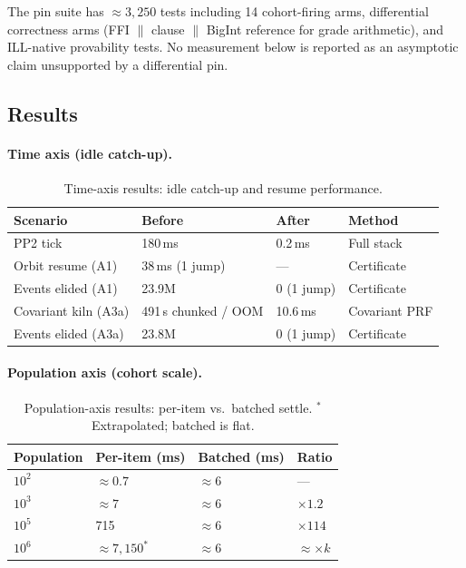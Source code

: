 \documentclass[11pt]{article}
\theoremstyle{definition}
\theoremstyle{remark}
\begin{document}
The pin suite has $\approx 3{,}250$ tests including 14 cohort-firing arms,
differential correctness arms (FFI $\|$ clause $\|$ BigInt reference for grade
arithmetic), and ILL-native provability tests.  No measurement below is reported
as an asymptotic claim unsupported by a differential pin.

\subsection{Results}

\paragraph{Time axis (idle catch-up).}

\begin{table}[ht]
\centering
\begin{tabular}{@{}llll@{}}
\toprule
Scenario              & Before               & After          & Method \\
\midrule
PP2 tick              & 180\,ms              & 0.2\,ms        & Full stack \\
Orbit resume (A1)     & 38\,ms (1 jump)      & ---            & Certificate \\
Events elided (A1)    & 23.9M                & 0 (1 jump)     & Certificate \\
Covariant kiln (A3a)  & 491\,s chunked / OOM & 10.6\,ms       & Covariant PRF \\
Events elided (A3a)   & 23.8M                & 0 (1 jump)     & Certificate \\
\bottomrule
\end{tabular}
\caption{Time-axis results: idle catch-up and resume performance.}
\label{tab:time-axis}
\end{table}

\paragraph{Population axis (cohort scale).}

\begin{table}[ht]
\centering
\begin{tabular}{@{}llll@{}}
\toprule
Population & Per-item (ms) & Batched (ms) & Ratio \\
\midrule
$10^2$ & $\approx 0.7$ & $\approx 6$ & --- \\
$10^3$ & $\approx 7$   & $\approx 6$ & $\times 1.2$ \\
$10^5$ & 715           & $\approx 6$ & $\times 114$ \\
$10^6$ & $\approx 7{,}150^*$ & $\approx 6$ & $\approx \times k$ \\
\bottomrule
\end{tabular}
\caption{Population-axis results: per-item vs.\ batched settle.
  ${}^*$Extrapolated; batched is flat.}
\label{tab:population-axis}
\end{table}
\end{document}
